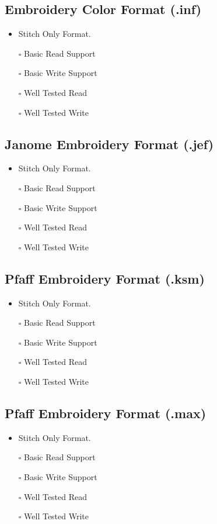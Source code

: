 \documentclass[onesize, a4paper]{refart}
\providecommand{\tightlist}{\setlength{\itemsep}{0pt}\setlength{\parskip}{0pt}}
\begin{document}
\subsection{Embroidery Color Format (.inf)}

\begin{itemize}
\tightlist
\item Stitch Only Format.
\item[$\square$] Basic Read Support
\item[$\square$] Basic Write Support
\item[$\square$] Well Tested Read
\item[$\square$] Well Tested Write
\end{itemize}

\subsection{Janome Embroidery Format (.jef)}

\begin{itemize}
\tightlist
\item Stitch Only Format.
\item[$\square$] Basic Read Support
\item[$\square$] Basic Write Support
\item[$\square$] Well Tested Read
\item[$\square$] Well Tested Write
\end{itemize}

\subsection{Pfaff Embroidery Format (.ksm)}

\begin{itemize}
\tightlist
\item Stitch Only Format.
\item[$\square$] Basic Read Support
\item[$\square$] Basic Write Support
\item[$\square$] Well Tested Read
\item[$\square$] Well Tested Write
\end{itemize}

\subsection{Pfaff Embroidery Format (.max)}

\begin{itemize}
\tightlist
\item Stitch Only Format.
\item[$\square$] Basic Read Support
\item[$\square$] Basic Write Support
\item[$\square$] Well Tested Read
\item[$\square$] Well Tested Write
\end{itemize}
\end{document}
